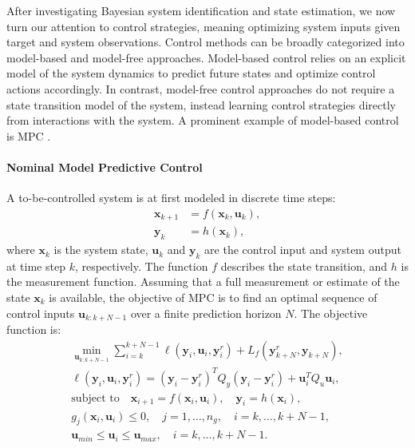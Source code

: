 After investigating Bayesian system identification and state estimation, we now turn our attention to control strategies, meaning optimizing system inputs given target and system observations. Control methods can be broadly categorized into model-based and model-free approaches. Model-based control relies on an explicit model of the system dynamics to predict future states and optimize control actions accordingly. In contrast, model-free control approaches do not require a state transition model of the system, instead learning control strategies directly from interactions with the system. A prominent example of model-based control is \acf{MPC} \citep{mpcreview1989, mpcbook2020}. 

\paragraph{Nominal Model Predictive Control}
A to-be-controlled system is at first modeled in discrete time steps:
\begin{subequations}
\begin{align}
    \label{eq:mpc_model}
    \boldsymbol{x}_{k+1} &= f(\boldsymbol{x}_k, \boldsymbol{u}_k), \\
    \boldsymbol{y}_k &= h(\boldsymbol{x}_k),
\end{align}
\end{subequations}
where $\boldsymbol{x}_k$ is the system state, $\boldsymbol{u}_k$ and $\boldsymbol{y}_k$ are the control input and system output at time step $k$, respectively. The function $f$ describes the state transition, and $h$ is the measurement function. Assuming that a full measurement or estimate of the state $\boldsymbol{x}_k$ is available, the objective of \ac{MPC} is to find an optimal sequence of control inputs $\boldsymbol{u}_{k:k+N-1}$ over a finite prediction horizon $N$. The objective function is:
\begin{subequations}
    \label{eq:mpc}
    \begin{gather}
        \min_{\boldsymbol{u}_{k:k+N-1}} \sum_{i=k}^{k+N-1}\ell(\boldsymbol{y}_{i}, \boldsymbol{u}_{i}, \boldsymbol{y}^r_{i})+L_f(\boldsymbol{y}^r_{k+N},\boldsymbol{y}_{k+N}),\\
        \ell(\boldsymbol{y}_{i}, \boldsymbol{u}_{i}, \boldsymbol{y}^r_{i})=(\boldsymbol{y}_{i}-\boldsymbol{y}^r_{i})^TQ_y(\boldsymbol{y}_{i}-\boldsymbol{y}^r_{i})+\boldsymbol{u}_{i}^TQ_u\boldsymbol{u}_{i},\\
        \text{subject to} \quad \boldsymbol{x}_{i+1} = f(\boldsymbol{x}_i, \boldsymbol{u}_i), \quad \boldsymbol{y}_i = h(\boldsymbol{x}_i),\\
        g_j(\boldsymbol{x}_i, \boldsymbol{u}_i)\leq 0, \quad j=1,\ldots,n_g, \quad i=k,\ldots,k+N-1,\\
        \boldsymbol{u}_{min}\leq\boldsymbol{u}_i\leq\boldsymbol{u}_{max}, \quad i=k,\ldots,k+N-1.
    \end{gather}
\end{subequations}
